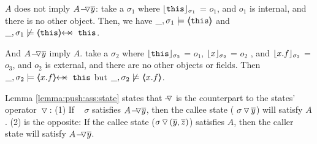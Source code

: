 { 


\newcommand{\sigmas}{\widetilde \sigma}



\vspace{.1cm}

\begin{example}
\label{push:does:not:imply}
$A$ does not imply $\PushAS {y} {A}$: \Eg  take 
  a   $\sigma_1$ where $\interpret {\sigma_1} {\prg{this}}$ = $o_1$, and $o_1$ is internal,  and there is no other object. Then, we have
$\_,\sigma_1 \models \inside {\prg{this}}$ and $\_,\sigma_1 \not\models \protectedFrom {\prg{this}} {\prg{this}}$.

And $\PushAS {y} {A}$  imply $A$. \Eg  take a $\sigma_2$ where $\interpret {\sigma_2} {\prg{this}}$ = $o_1$,
 $\interpret {\sigma_2} {x}$ = $o_2$ , and  $\interpret {\sigma_2} {x.f}$ = $o_3$, and $o_2$ is external, and there are no other objects or fields.
 Then $\_,\sigma_2 \models   \protectedFrom {x.f} {\prg{this}}$ but  $\_,\sigma_2 \not\models \inside {x.f}$.
\end{example}

 Lemma \ref{lemma:push:ass:state}  states that $\pushSymbolAA$ is the counterpart to the states' operator $\pushSymbol$:
 (1) If \ %
$\sigma$ satisfies  $\PushAS y A$, then  the callee state  ($\PushS {y} {\sigma}$) %
will satisfy $A$. %
(2) is the opposite: {If the callee state ($\PushSLong {(\overline y, \overline z)} {\sigma}$) %
 satisfies $A$, then the caller state will satisfy 
$\PushAS {y} {A}$. } %


}
